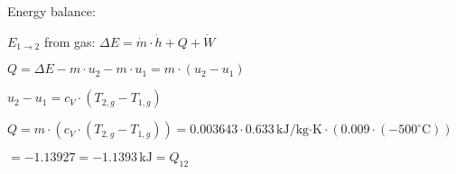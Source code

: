 Energy balance:  

\( E_{1 \rightarrow 2} \) from gas:  
\( \Delta E = \dot{m} \cdot \dot{h} + Q + \dot{W} \)  

\( Q = \Delta E - m \cdot u_2 - m \cdot u_1 = m \cdot (u_2 - u_1) \)  

\( u_2 - u_1 = c_V \cdot (T_{2,g} - T_{1,g}) \)  

\( Q = m \cdot (c_V \cdot (T_{2,g} - T_{1,g})) = 0.003643 \cdot 0.633 \, \text{kJ/kg·K} \cdot (0.009 \cdot (-500^\circ \text{C})) \)  

\( = -1.13927 = -1.1393 \, \text{kJ} = Q_{12} \)